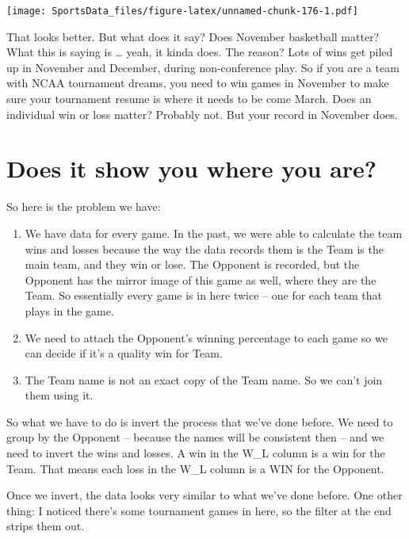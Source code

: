 \documentclass[
]{book}
\providecommand{\tightlist}{%
  \setlength{\itemsep}{0pt}\setlength{\parskip}{0pt}}
\begin{document}
\texttt{[image: SportsData\_files/figure-latex/unnamed-chunk-176-1.pdf]}

That looks better. But what does it say? Does November basketball matter? What this is saying is \ldots{} yeah, it kinda does. The reason? Lots of wins get piled up in November and December, during non-conference play. So if you are a team with NCAA tournament dreams, you need to win games in November to make sure your tournament resume is where it needs to be come March. Does an individual win or loss matter? Probably not. But your record in November does.

\hypertarget{does-it-show-you-where-you-are}{%
\section{Does it show you where you are?}\label{does-it-show-you-where-you-are}}

So here is the problem we have:

\begin{enumerate}
\def\labelenumi{\arabic{enumi}.}
\tightlist
\item
  We have data for every game. In the past, we were able to calculate the team wins and losses because the way the data records them is the Team is the main team, and they win or lose. The Opponent is recorded, but the Opponent has the mirror image of this game as well, where they are the Team. So essentially every game is in here twice -- one for each team that plays in the game.
\item
  We need to attach the Opponent's winning percentage to each game so we can decide if it's a quality win for Team.
\item
  The Team name is not an exact copy of the Team name. So we can't join them using it.
\end{enumerate}

So what we have to do is invert the process that we've done before. We need to group by the Opponent -- because the names will be consistent then -- and we need to invert the wins and losses. A win in the W\_L column is a win for the Team. That means each loss in the W\_L column is a WIN for the Opponent.

Once we invert, the data looks very similar to what we've done before. One other thing: I noticed there's some tournament games in here, so the filter at the end strips them out.
\end{document}
